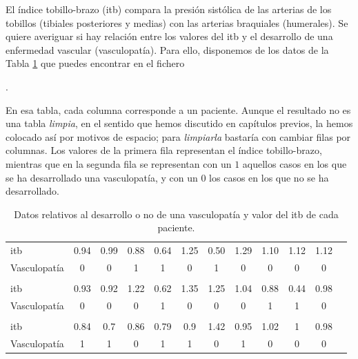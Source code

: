 \begin{ejemplo}
\label{cap13:ejem:RegresionLogistica00}
El {\sf índice tobillo-brazo} (itb) compara la presión sistólica de las arterias de los tobillos (tibiales posteriores y medias) con las arterias braquiales (humerales). Se quiere averiguar si hay relación entre los valores del itb y el desarrollo de una enfermedad vascular (vasculopatía). Para ello, disponemos de los datos de la Tabla \ref{cap13:TablaDatosVasculopatia} que puedes encontrar en el fichero
\begin{center}
	 .
\end{center}
En esa tabla, cada columna corresponde a un paciente. Aunque el resultado no es una tabla {\em limpia}, en el sentido que hemos discutido en capítulos previos, la hemos colocado así por motivos de espacio; para {\em limpiarla} bastaría con cambiar filas por columnas. Los valores de la primera fila representan el índice tobillo-brazo, mientras que en la segunda fila se representan con un $1$ aquellos casos en los que se ha desarrollado una vasculopatía, y con un $0$ los casos en los que no se ha desarrollado.

\begin{table}[h!]
\begin{center}
 \begin{tabular}{lccccccccccc}%
 \hline
itb	& 0.94 & 0.99 & 0.88 & 0.64 & 1.25 & 0.50 & 1.29 & 1.10 & 1.12 & 1.12 \\
Vasculopat\'ia &  0 & 0 & 1 & 1 & 0 & 1 & 0 & 0 & 0 & 0\\\hline
& & & & & & & & & & \\
 \hline
itb &		   0.93 & 0.92 & 1.22 & 0.62 & 1.35 & 1.25 & 1.04 & 0.88 & 0.44 & 0.98 \\
Vasculopat\'ia & 0 & 0 & 0 & 1 & 0 & 0 & 0 & 1 & 1 & 0   \\\hline
& & & & & & & & & & \\
\hline
itb &	0.84 & 0.7 & 0.86 & 0.79 & 0.9 & 1.42 & 0.95 & 1.02 & 1 & 0.98  \\
Vasculopat\'ia & 1 & 1 & 0 & 1 & 1 & 0 & 1 & 0 & 0 & 0  \\\hline
 \end{tabular}
\end{center}\caption{Datos relativos al desarrollo o no de una
vasculopat\'ia y valor del itb de cada paciente.}
\label{cap13:TablaDatosVasculopatia}
\end{table}


\end{ejemplo}
